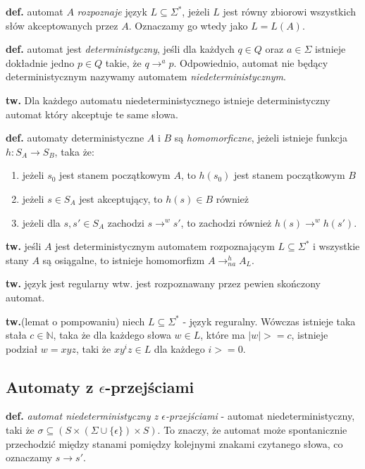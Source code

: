 \documentclass{article}
\begin{document}
	\textbf{def.} automat  $A$ \textit{rozpoznaje} język $L \subseteq \Sigma^*$, jeżeli $L$ jest równy zbiorowi wszystkich słów akceptowanych przez $A$. Oznaczamy go wtedy jako $L = L(A)$.
	
	\textbf{def.}  automat jest \textit{deterministyczny}, jeśli dla każdych $q \in Q$ oraz $a \in \Sigma$ istnieje dokładnie jedno $p \in Q$ takie, że $q \rightarrow^a p$. Odpowiednio, automat nie będący deterministycznym nazywamy automatem \textit{niedeterministycznym}.

	\textbf{tw.} Dla każdego automatu niedeterministycznego istnieje deterministyczny automat który akceptuje te same słowa.

	\textbf{def.} automaty deterministyczne $A$ i $B$ są \textit{homomorficzne}, jeżeli istnieje funkcja $h: S_A \rightarrow S_B$, taka że:
	\begin{enumerate}
		\item jeżeli $s_0$ jest stanem początkowym $A$, to $h(s_0)$ jest stanem początkowym $B$
		\item jeżeli $s \in S_A$ jest akceptujący, to $h(s) \in B$ również
		\item jeżeli dla $s, s' \in S_A$ zachodzi $s \rightarrow^w s'$, to zachodzi również $h(s) \rightarrow^w h(s')$.
	\end{enumerate}
	
	\textbf{tw.} jeśli $A$ jest deterministycznym automatem rozpoznającym $L \subseteq \Sigma^*$ i wszystkie stany $A$ są osiągalne, to istnieje homomorfizm $A \rightarrow^h_{na} A_L$. 
	
	\textbf{tw.}  język jest regularny wtw. jest rozpoznawany przez pewien skończony automat.

	\textbf{tw.}(lemat o pompowaniu) niech $L \subseteq \Sigma^*$ - język reguralny. Wówczas istnieje taka stała $c \in \mathbb{N}$, taka że dla każdego słowa $w \in L$, które ma $|w| >= c$, istnieje podział $w = xyz$, taki że $xy^{i}z \in L$ dla każdego $i >= 0$.

\subsection{Automaty z $\epsilon$-przejściami}	
	\textbf{def.} \textit{automat niedeterministyczny z $\epsilon$-przejściami} - automat niedeterministyczny, taki że $\sigma \subseteq (S \times (\Sigma \cup \{\epsilon\}) \times S)$. To znaczy, że automat może spontanicznie przechodzić między stanami pomiędzy kolejnymi znakami czytanego słowa, co oznaczamy $s \rightarrow s'$.
	
\end{document}
